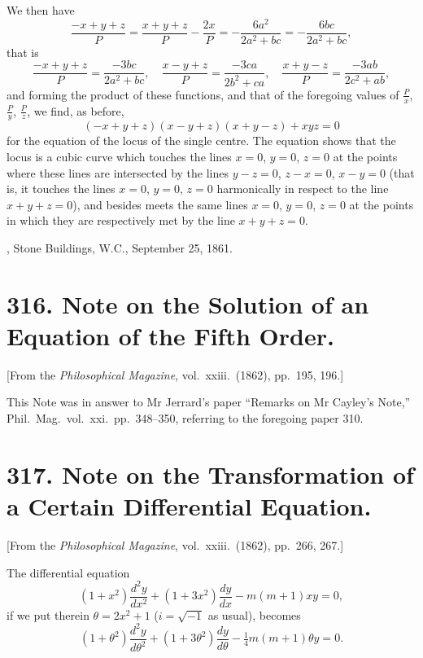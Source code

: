 \documentclass[11pt,a4paper]{article}
\theoremstyle{plain}
\begin{document}
We then have
\[
\frac{-x + y + z}{P} = \frac{x + y + z}{P} - \frac{2x}{P} = -\frac{6a^2}{2a^2 + bc} = -\frac{6bc}{2a^2 + bc},
\]
that is
\[
\frac{-x + y + z}{P} = \frac{-3bc}{2a^2 + bc}, \quad \frac{x - y + z}{P} = \frac{-3ca}{2b^2 + ca}, \quad \frac{x + y - z}{P} = \frac{-3ab}{2c^2 + ab},
\]
and forming the product of these functions, and that of the foregoing values of $\frac{P}{x}$, $\frac{P}{y}$, $\frac{P}{z}$, we find, as before,
\[
(-x + y + z)(x - y + z)(x + y - z) + xyz = 0
\]
for the equation of the locus of the single centre. The equation shows that the locus is a cubic curve which touches the lines $x = 0$, $y = 0$, $z = 0$ at the points where these lines are intersected by the lines $y - z = 0$, $z - x = 0$, $x - y = 0$ (that is, it touches the lines $x = 0$, $y = 0$, $z = 0$ harmonically in respect to the line $x + y + z = 0$), and besides meets the same lines $x = 0$, $y = 0$, $z = 0$ at the points in which they are respectively met by the line $x + y + z = 0$.

\medskip
{}, Stone Buildings, W.C., September 25, 1861.


\newpage
\section*{316. Note on the Solution of an Equation of the Fifth Order.}

[From the \textit{Philosophical Magazine}, vol.\ xxiii.\ (1862), pp.\ 195, 196.]

\medskip

This Note was in answer to Mr Jerrard's paper ``Remarks on Mr Cayley's Note,'' Phil.\ Mag.\ vol.\ xxi.\ pp.\ 348--350, referring to the foregoing paper 310.


\newpage
\section*{317. Note on the Transformation of a Certain Differential Equation.}

[From the \textit{Philosophical Magazine}, vol.\ xxiii.\ (1862), pp.\ 266, 267.]

\medskip

The differential equation
\[
(1 + x^2)\frac{d^2y}{dx^2} + (1 + 3x^2)\frac{dy}{dx} - m(m+1)xy = 0,
\]
if we put therein $\theta = 2x^2 + 1$ ($i = \sqrt{-1}$ as usual), becomes
\[
(1 + \theta^2)\frac{d^2y}{d\theta^2} + (1 + 3\theta^2)\frac{dy}{d\theta} - \tfrac{1}{4}m(m+1)\theta y = 0.
\]
\end{document}
